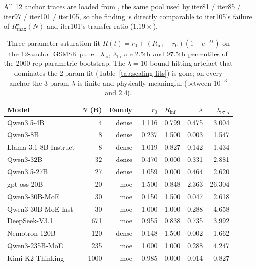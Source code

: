 All 12 anchor traces are loaded from
,
the same pool used by iter81 / iter85 / iter97 / iter101 / iter105,
so the finding is directly comparable to iter105's failure of
$R_\mathrm{max}^\star(N)$ and iter101's transfer-ratio
($1.19\times$).

\begin{table}[t]
\centering
\small
\caption{Three-parameter saturation fit
$R(t) = r_0 + (R_\mathrm{inf} - r_0)(1 - e^{-\lambda t})$
on the 12-anchor GSM8K panel.
$\lambda_\mathrm{lo}$, $\lambda_\mathrm{hi}$ are 2.5th and 97.5th
percentiles of the 2000-rep parametric bootstrap.
The $\lambda = 10$ bound-hitting artefact that dominates the 2-param
fit (Table~\ref{tab:scaling-fits}) is gone; on every anchor the
3-param $\lambda$ is finite and physically meaningful (between
$10^{-3}$ and $2.4$).
\label{tab:iter109-sat}}
\begin{tabular}{lrrrlrr}
\toprule
Model & $N$ (B) & Family &
       $r_0$ & $R_\mathrm{inf}$ &
       $\lambda$ & $\lambda_{97.5}$ \\
\midrule
Qwen3.5-4B            &    4 & dense &  1.116 & 0.799 &  0.475 &  3.004 \\
Qwen3-8B              &    8 & dense &  0.237 & 1.500 &  0.003 &  1.547 \\
Llama-3.1-8B-Instruct &    8 & dense &  1.019 & 0.827 &  0.142 &  1.434 \\
Qwen3-32B             &   32 & dense &  0.470 & 0.000 &  0.331 &  2.881 \\
Qwen3.5-27B           &   27 & dense &  1.059 & 0.000 &  0.464 &  2.620 \\
gpt-oss-20B           &   20 & moe   & -1.500 & 0.848 &  2.363 & 26.304 \\
Qwen3-30B-MoE         &   30 & moe   &  0.150 & 1.500 &  0.047 &  2.618 \\
Qwen3-30B-MoE-Inst    &   30 & moe   &  1.000 & 1.000 &  0.288 &  4.658 \\
DeepSeek-V3.1         &  671 & moe   &  0.955 & 0.838 &  0.735 &  3.992 \\
Nemotron-120B         &  120 & dense &  0.148 & 1.500 &  0.002 &  1.662 \\
Qwen3-235B-MoE        &  235 & moe   &  1.000 & 1.000 &  0.288 &  4.247 \\
Kimi-K2-Thinking      & 1000 & moe   &  0.985 & 0.000 &  0.014 &  0.827 \\
\bottomrule
\end{tabular}
\end{table}

